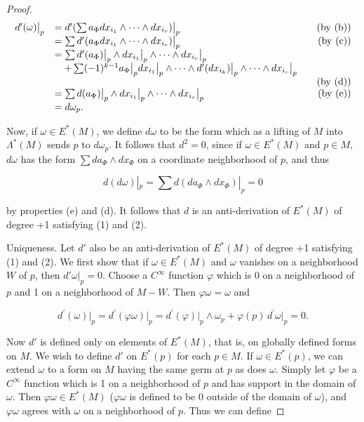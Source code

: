 \begin{proof}
\[
\begin{array}{r l r}{d^{\prime}(\omega)\big\vert_{p}}&{=d^{\prime}(\sum a_{\Phi}d x_{i_{1}}\wedge\dots\wedge d x_{i_{r}})\big\vert_{p}}&{\quad\mathrm{(by~(b))}}\\ &{=\sum d^{\prime}(a_{\Phi}d x_{i_{1}}\wedge\dots\wedge d x_{i_{r}})\big\vert_{p}}&{\quad\mathrm{(by~(c))}}\\ &{=\sum d^{\prime}(a_{\Phi})\big\vert_{p}\wedge d x_{i_{1}}\big\vert_{p}\wedge\dots\wedge d x_{i_{r}}\big\vert_{p}}\\ &{\quad+\sum(-1)^{k-1}a_{\Phi}\big\vert_{p}d x_{i_{1}}\big\vert_{p}\wedge\dots\wedge d^{\prime}(d x_{i_{k}})\big\vert_{p}\wedge\dots\wedge d x_{i_{r}}\big\vert_{p}}\\ &{}&{\quad\mathrm{(by~(d))}}\\ &{=\sum d(a_{\Phi})\big\vert_{p}\wedge d x_{i_{1}}\big\vert_{p}\wedge\dots\wedge d x_{i_{r}}\big\vert_{p}}&{\quad\mathrm{(by~(e))}}\\ &{=d\omega_{p}.}\end{array}
\]

Now, if $\omega \in E^*(M)$, we define $d\omega$ to be the form which as a lifting of $M$ into $\Lambda^*(M)$ sends $p$ to $d\omega_p$. It follows that $d^2 = 0$, since if $\omega \in E^*(M)$ and $p \in M$, $d\omega$ has the form $\sum da_\Phi \wedge dx_\Phi$ on a coordinate neighborhood of $p$, and thus

\[
d(d\omega)|_{p}=\sum d(d a_{\Phi}\wedge d x_{\Phi})|_{p}=0
\]

by properties (e) and (d). It follows that $d$ is an anti-derivation of $E^{*}(M)$ of degree +1 satisfying (1) and (2).

Uniqueness. Let $d'$ also be an anti-derivation of $E^{*}(M)$ of degree +1 satisfying (1) and (2). We first show that if $\omega \in E^{*}(M)$ and $\omega$ vanishes on a neighborhood $W$ of $p$, then $d'\omega|_{p} = 0$. Choose a $C^{\infty}$ function $\varphi$ which is 0 on a neighborhood of $p$ and 1 on a neighborhood of $M - W$. Then $\varphi\omega = \omega$ and

\[
d^{\prime}(\omega)\big|_{p}=d^{\prime}(\varphi\omega)\big|_{p}=d^{\prime}(\varphi)\big|_{p}\wedge\omega_{p}+\varphi(p)\,d^{\prime}\omega\big|_{p}=0.
\]

Now $d'$ is defined only on elements of $E^{*}(M)$, that is, on globally defined forms on $M$. We wish to define $d'$ on $E^{*}(p)$ for each $p \in M$. If $\omega \in E^{*}(p)$, we can extend $\omega$ to a form on $M$ having the same germ at $p$ as does $\omega$. Simply let $\varphi$ be a $C^{\infty}$ function which is 1 on a neighborhood of $p$ and has support in the domain of $\omega$. Then $\varphi\omega \in E^{*}(M)$ ($\varphi\omega$ is defined to be 0 outside of the domain of $\omega$), and $\varphi\omega$ agrees with $\omega$ on a neighborhood of $p$. Thus we can define


\end{proof}
